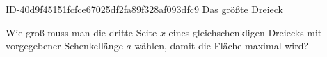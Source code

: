\begin{exercise}
      {ID-40d9f45151fcfce67025df2fa89f328af093dfc9}
      {Das größte Dreieck}
  \ifproblem\problem\par
    Wie groß muss man die dritte Seite $x$ eines gleichschenkligen Dreiecks
    mit vorgegebener Schenkellänge $a$ wählen, damit die Fläche maximal
    wird?
    \begin{center}
    \end{center}
  \fi
\end{exercise}
